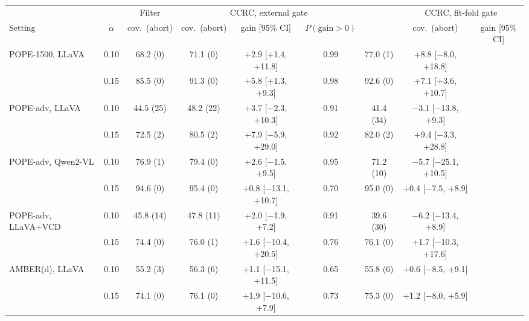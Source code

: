 \begin{tabular}{lcccccccc}
\toprule
 & & Filter & \multicolumn{3}{c}{CCRC, external gate} & & \multicolumn{2}{c}{CCRC, fit-fold gate}\\
\cmidrule(lr){4-6}\cmidrule(lr){8-9}
Setting & $\alpha$ & cov.\ (abort) & cov.\ (abort) & gain [95\% CI] & $P(\text{gain}>0)$ & & cov.\ (abort) & gain [95\% CI]\\
\midrule
POPE-1500, LLaVA & 0.10 & 68.2 (0) & 71.1 (0) & +2.9 [+1.4, +11.8] & 0.99 & 77.0 (1) & +8.8 [$-$8.0, +18.8]\\
 & 0.15 & 85.5 (0) & 91.3 (0) & +5.8 [+1.3, +9.3] & 0.98 & 92.6 (0) & +7.1 [+3.6, +10.7]\\
\addlinespace
POPE-adv, LLaVA & 0.10 & 44.5 (25) & 48.2 (22) & +3.7 [$-$2.3, +10.3] & 0.91 & 41.4 (34) & $-$3.1 [$-$13.8, +9.3]\\
 & 0.15 & 72.5 (2) & 80.5 (2) & +7.9 [$-$5.9, +29.0] & 0.92 & 82.0 (2) & +9.4 [$-$3.3, +28.8]\\
\addlinespace
POPE-adv, Qwen2-VL & 0.10 & 76.9 (1) & 79.4 (0) & +2.6 [$-$1.5, +9.5] & 0.95 & 71.2 (10) & $-$5.7 [$-$25.1, +10.5]\\
 & 0.15 & 94.6 (0) & 95.4 (0) & +0.8 [$-$13.1, +10.7] & 0.70 & 95.0 (0) & +0.4 [$-$7.5, +8.9]\\
\addlinespace
POPE-adv, LLaVA+VCD & 0.10 & 45.8 (14) & 47.8 (11) & +2.0 [$-$1.9, +7.2] & 0.91 & 39.6 (30) & $-$6.2 [$-$13.4, +8.9]\\
 & 0.15 & 74.4 (0) & 76.0 (1) & +1.6 [$-$10.4, +20.5] & 0.76 & 76.1 (0) & +1.7 [$-$10.3, +17.6]\\
\addlinespace
AMBER(d), LLaVA & 0.10 & 55.2 (3) & 56.3 (6) & +1.1 [$-$15.1, +11.5] & 0.65 & 55.8 (6) & +0.6 [$-$8.5, +9.1]\\
 & 0.15 & 74.1 (0) & 76.1 (0) & +1.9 [$-$10.6, +7.9] & 0.73 & 75.3 (0) & +1.2 [$-$8.0, +5.9]\\
\bottomrule
\end{tabular}
